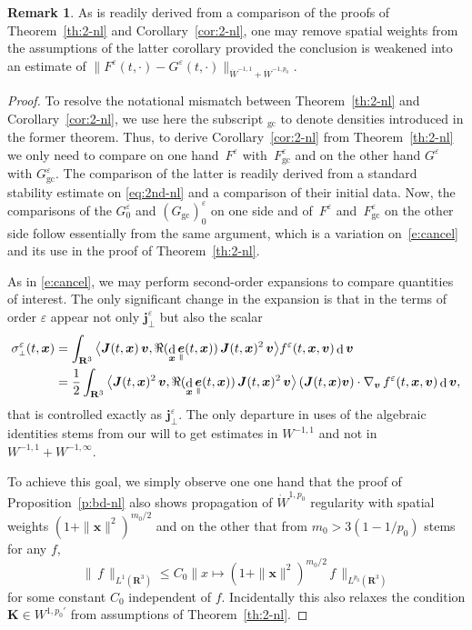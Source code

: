 \documentclass[JEP,XML,SOM,Unicode]{cedram}
\newcommand{\sperp}{{\scriptscriptstyle\perp}}
\newcommand{\blangle}{\bigl\langle}
\newcommand{\brangle}{\bigr\rangle}
\let\eps\varepsilon
\DeclareMathOperator\dD{d}\let\dd\dD
\theoremstyle{plain}
\theoremstyle{definition}
\newtheorem{remark}[theorem]{Remark}
\newcommand\br{\begin{remark}}
\newcommand\er{\end{remark}}
\newcommand\R{\mathbf R}
\newcommand\bJ{{\boldsymbol J}}
\newcommand\bK{{\boldsymbol K}}
\newcommand\bfj{{\boldsymbol j}}
\newcommand\bfv{{\boldsymbol v}}
\newcommand\bfx{{\boldsymbol x}}
\DeclareMathOperator{\beD}{\boldsymbol{e}}
\newcommand\eDpar{\beD_\mypar}
\newcommand{\mypar}{{\mkern3mu\vphantom{\perp}\vrule depth 0pt\mkern2mu\vrule depth 0pt\mkern3mu}}
\begin{document}
\br
As is readily derived from a comparison of the proofs of Theorem~\ref{th:2-nl} and Corollary~\ref{cor:2-nl}, one may remove spatial weights from the assumptions of the latter corollary provided the conclusion is weakened into an estimate of \hbox{$\|F^\eps(t,\cdot)-G^\eps(t,\cdot)\|_{\dot{W}^{-1,1}+\dot{W}^{-1,p_0}}$}.
\er

\begin{proof}
To resolve the notational mismatch between Theorem~\ref{th:2-nl} and Corollary~\ref{cor:2-nl}, we use here the subscript ${}_\mathrm{gc}$ to denote densities introduced in the former theorem. Thus, to derive Corollary~\ref{cor:2-nl} from Theorem~\ref{th:2-nl} we only need to compare on one hand~$F^\eps$ with~$F_\mathrm{gc}^\eps$ and on the other hand $G^\eps$ with $G_\mathrm{gc}^\eps$. The comparison of the latter is readily derived from a standard stability estimate on \eqref{eq:2nd-nl} and a comparison of their initial data. Now, the comparisons of the $G_0^\eps$ and $(G_\mathrm{gc})_0^\eps$ on one side and of~$F^\eps$ and~$F_\mathrm{gc}^\eps$ on the other side follow essentially from the same argument, which is a variation on~\eqref{e:cancel} and its use in the proof of Theorem~\ref{th:2-nl}.

As in \eqref{e:cancel}, we may perform second-order expansions to compare quantities of interest. The only significant change in the expansion is that in the terms of order $\eps$ appear not only $\bfj_\sperp^\eps$ but also the scalar
\begin{align*}
\sigma_\sperp^\eps(t,\bfx)&
=
\int_{\R^3}\,
\blangle\bJ(t,\bfx)\,\bfv,\Re(\dD_\bfx\eDpar(t,\bfx))\,\bJ(t,\bfx)^2\,\bfv\brangle
f^\eps(t,\bfx,\bfv)\dD \bfv\\
&=
\frac12\int_{\R^3}\,
\blangle\bJ(t,\bfx)^2\,\bfv,\Re(\dD_\bfx\eDpar(t,\bfx))\,\bJ(t,\bfx)^2\,\bfv\brangle
\, (\bJ(t,\bfx)\bfv)\cdot\nabla_\bfv\,f^\eps(t,\bfx,\bfv)\dD \bfv,
\end{align*}
that is controlled exactly as $\bfj_\sperp^\eps$. The only departure in uses of the algebraic identities stems from our will to get estimates in $W^{-1,1}$ and not in $W^{-1,1}+W^{-1,\infty}$.

To achieve this goal, we simply observe one one hand that the proof of Proposition~\ref{p:bd-nl} also shows propagation of $\dot{W}^{1,p_0}$ regularity with spatial weights $(1+\|\bfx\|^2)^{m_0/2}$ and on the other that from $m_0>3(1-1/p_0)$ stems for any $f$,\enlargethispage{\baselineskip}%
\[
\|\,f\,\|_{L^1(\R^3)}\leq C_0 \|x\mapsto (1+\|\bfx\|^2)^{m_0/2}\,f\,\|_{L^{p_0}(\R^3)}
\]
for some constant $C_0$ independent of $f$. Incidentally this also relaxes the condition $\bK\in W^{1,p_0'}$ from assumptions of Theorem~\ref{th:2-nl}.
\end{proof}
\end{document}
